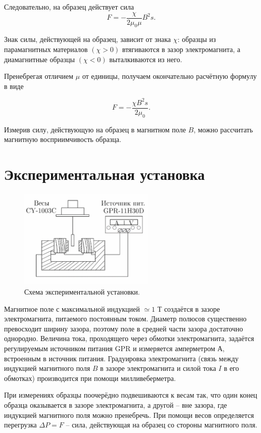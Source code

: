 \documentclass[11pt]{article}
\begin{document}
Следовательно, на образец действует сила
\begin{equation}\label{4}
F = -\frac{\chi}{2\mu_0\mu}B^2s.
\end{equation}

Знак силы, действующей на образец, зависит от знака $ \chi $: образцы из парамагнитных материалов $( \chi  > 0)$ втягиваются в зазор электромагнита, а диамагнитные образцы $ (\chi < 0) $ выталкиваются из него.

Пренебрегая отличием $ \mu $ от единицы, получаем окончательно расчётную формулу в виде

\begin{equation}\label{5}
F = -\frac{\chi B^2s}{2\mu_0}.
\end{equation}

Измерив силу, действующую на образец в магнитном поле $ B $, можно рассчитать магнитную восприимчивость образца.


\section{Экспериментальная установка}

\begin{figure}
    \includegraphics[width=6.5cm]{Screenshot_1.png}
    \caption{Схема экспериментальной установки.}
    \label{pic:2}
\end{figure}


Магнитное поле с максимальной индукцией $ \simeq 1 $ Т создаётся в зазоре электромагнита, питаемого постоянным током. Диаметр полюсов существенно превосходит ширину зазора, поэтому поле в средней части зазора достаточно однородно. Величина тока, проходящего через обмотки электромагнита, задаётся регулируемым источником питания GPR и измеряется амперметром $ А $, встроенным в источник питания. Градуировка электромагнита (связь между индукцией магнитного поля $ B $ в зазоре электромагнита и силой тока $ I $ в его обмотках) производится при помощи милливеберметра.


При измерениях образцы поочерёдно подвешиваются к весам так, что один конец образца оказывается в зазоре электромагнита, а другой -- вне зазора, где индукцией магнитного поля можно пренебречь. При помощи весов определяется перегрузка $ \Delta P = F $ -- сила, действующая на образец со стороны магнитного поля.
\end{document}
